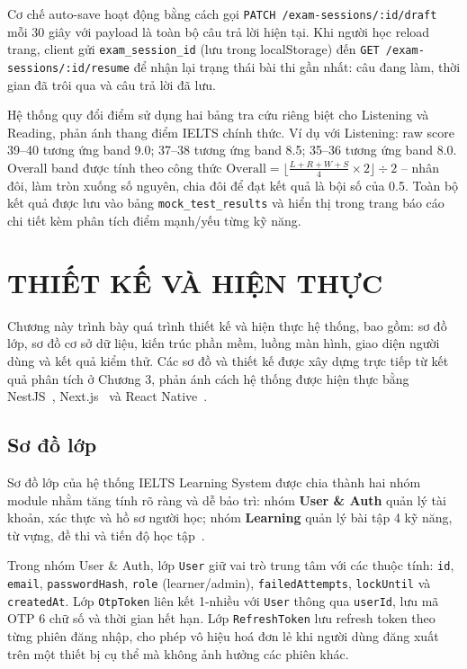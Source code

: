 \documentclass[a4paper,12pt]{extreport}
\begin{document}
Cơ chế auto-save hoạt động bằng cách gọi \texttt{PATCH /exam-sessions/:id/draft} mỗi 30 giây với payload là toàn bộ câu trả lời hiện tại. Khi người học reload trang, client gửi \texttt{exam\_session\_id} (lưu trong localStorage) đến \texttt{GET /exam-sessions/:id/resume} để nhận lại trạng thái bài thi gần nhất: câu đang làm, thời gian đã trôi qua và câu trả lời đã lưu.

Hệ thống quy đổi điểm sử dụng hai bảng tra cứu riêng biệt cho Listening và Reading, phản ánh thang điểm IELTS chính thức. Ví dụ với Listening: raw score 39--40 tương ứng band 9.0; 37--38 tương ứng band 8.5; 35--36 tương ứng band 8.0. Overall band được tính theo công thức $\text{Overall} = \lfloor \frac{L + R + W + S}{4} \times 2 \rfloor \div 2$ -- nhân đôi, làm tròn xuống số nguyên, chia đôi để đạt kết quả là bội số của 0.5. Toàn bộ kết quả được lưu vào bảng \texttt{mock\_test\_results} và hiển thị trong trang báo cáo chi tiết kèm phân tích điểm mạnh/yếu từng kỹ năng.

\chapter{THIẾT KẾ VÀ HIỆN THỰC}

Chương này trình bày quá trình thiết kế và hiện thực hệ thống, bao gồm: sơ đồ lớp, sơ đồ cơ sở dữ liệu, kiến trúc phần mềm, luồng màn hình, giao diện người dùng và kết quả kiểm thử. Các sơ đồ và thiết kế được xây dựng trực tiếp từ kết quả phân tích ở Chương 3, phản ánh cách hệ thống được hiện thực bằng NestJS~\cite{nestjs-docs}, Next.js~\cite{nextjs-docs} và React Native~\cite{reactnative-docs}.

\section{Sơ đồ lớp}

Sơ đồ lớp của hệ thống IELTS Learning System được chia thành hai nhóm module nhằm tăng tính rõ ràng và dễ bảo trì: nhóm \textbf{User \& Auth} quản lý tài khoản, xác thực và hồ sơ người học; nhóm \textbf{Learning} quản lý bài tập 4 kỹ năng, từ vựng, đề thi và tiến độ học tập~\cite{fowler2002patterns}.

Trong nhóm User \& Auth, lớp \texttt{User} giữ vai trò trung tâm với các thuộc tính: \texttt{id}, \texttt{email}, \texttt{passwordHash}, \texttt{role} (learner/admin), \texttt{failedAttempts}, \texttt{lockUntil} và \texttt{createdAt}. Lớp \texttt{OtpToken} liên kết 1-nhiều với \texttt{User} thông qua \texttt{userId}, lưu mã OTP 6 chữ số và thời gian hết hạn. Lớp \texttt{RefreshToken} lưu refresh token theo từng phiên đăng nhập, cho phép vô hiệu hoá đơn lẻ khi người dùng đăng xuất trên một thiết bị cụ thể mà không ảnh hưởng các phiên khác.
\end{document}
